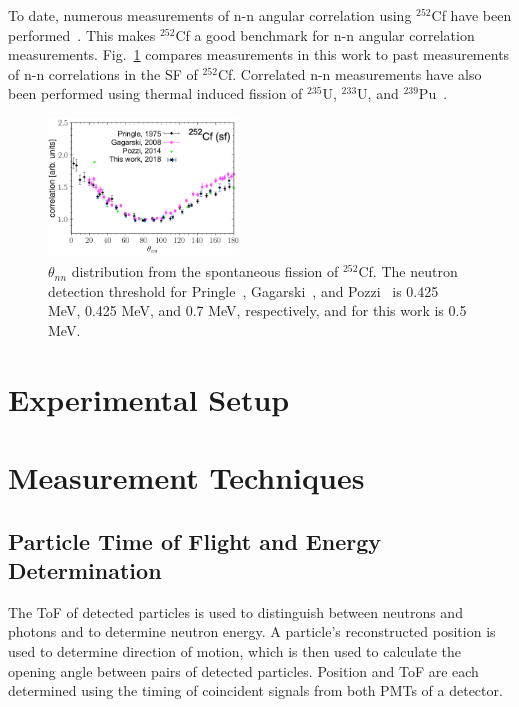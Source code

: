 \documentclass[%
 reprint,
 calc,
 amsmath,amssymb,
 aps,
 nofootinbib,
 linenumbers
]{revtex4-1}
\begin{document}
To date, numerous measurements of n-n angular correlation using $^{252}$Cf have been performed~\cite{Verbeke2018, Pozzi2014, 2008CF252, 1975Cf252}.
This makes $^{252}$Cf a good benchmark for n-n angular correlation measurements.
Fig.~\ref{fig:Cf252_us_vs_them} compares measurements in this work to past measurements of n-n correlations in the SF of $^{252}$Cf.
Correlated n-n measurements have also been performed using thermal induced fission of $^{235}$U, $^{233}$U, and $^{239}$Pu~\cite{Sokolov2010}.
\begin{figure}[h]
\centering
\includegraphics[width=0.45\textwidth]{Cf252_us_vs_them.png}
\caption{$\theta_{nn}$ distribution from the spontaneous fission of $^{252}$Cf.
 The neutron detection threshold for Pringle~\cite{1975Cf252}, Gagarski~\cite{2008CF252}, and Pozzi~\cite{Pozzi2016} is 0.425 MeV, 0.425 MeV, and 0.7 MeV, respectively, and for this work is 0.5 MeV.
}
\label{fig:Cf252_us_vs_them}
\end{figure}

\section{Experimental Setup}


\section{Measurement Techniques}
\subsection{Particle Time of Flight and Energy Determination}
\label{ToF_reconstruction}
The ToF of detected particles is used to distinguish between neutrons and photons and to determine neutron energy.
A particle's reconstructed position is used to determine direction of motion, which is then used to calculate the opening angle between pairs of detected particles.
Position and ToF are each determined using the timing of coincident signals from both PMTs of a detector.
\end{document}
